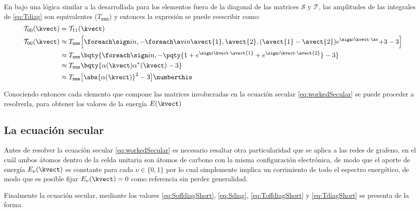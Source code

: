 En bajo una lógica similar a la desarrollada para los elementos fuera de la diagonal 
de las matrices $ \mathcal{S} $ y $ \mathcal{T} $, las amplitudes de las integrales 
de \eqref{eq:Tdiag} son equivalentes ($ T_{\mathtt{nnn}} $) y entonces la expresión 
se puede reescribir como:
\begin{align*}
\mathcal{T}_{00}(\kvect) &= \mathcal{T}_{11}(\kvect) \\
\mathcal{T}_{00}(\kvect) &\approx T_{\mathtt{nnn}} \Big[\foreach \sign in {,-}\foreach \av in {{\avect{1}},{\avect{2}},{(\avect{1}-\avect{2})}}{e^{\sign i\kvect\cdot\av}+} 3-3\Big]\\*
&\approx T_{\mathtt{nnn}} \bqty{\foreach \sign in {,-}{\pqty{1+e^{\sign i\kvect\cdot\avect{1}}+e^{\sign i\kvect\cdot\avect{2}}}} -3}\\*
&\approx T_{\mathtt{nnn}}\bqty{\alpha(\kvect)\alpha^*(\kvect) -3}\\*
&\approx T_{\mathtt{nnn}}\big[\abs{\alpha(\kvect)}^2 - 3\big] \numberthis\label{eq:TdiagShort}
\end{align*}

Conociendo entonces cada elemento que compone las matrices involucradas en la 
ecuación secular \eqref{eq:workedSecular} se puede proceder a resolverla, para 
obtener los valores de la energía $ E(\kvect) $

\subsection{La ecuación secular}

Antes de resolver la ecuación secular \eqref{eq:workedSecular} es necesario resaltar 
otra particularidad que se aplica a las redes de grafeno, en el cuál ambos átomos 
dentro de la celda unitaria son átomos de carbono con la misma configuración 
electrónica, de modo que el aporte de energía $ E_\nu(\kvect) $ es constante para 
cada $ \nu\in\{0,1\} $ por lo cual simplemente implica un corrimiento de todo el 
espectro energético, de modo que es posible fijar $ E_\nu(\kvect) = 0 $ como 
referencia sin perder generalidad.

Finalmente la ecuación secular, mediante los valores \eqref{eq:SoffdiagShort}, 
\eqref{eq:Sdiag}, \eqref{eq:ToffdiagShort} y \eqref{eq:TdiagShort} se presenta de la 
forma

